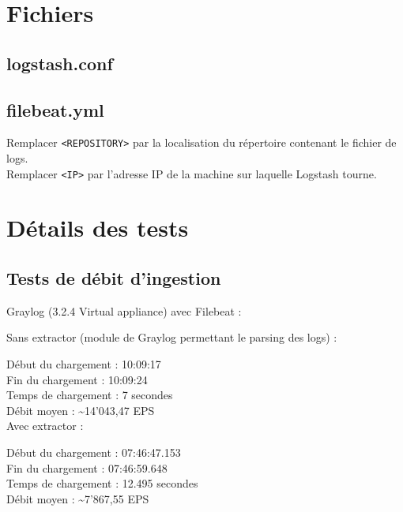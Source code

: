 \documentclass[paper=a4, fontsize=11pt]{scrartcl}
\begin{document}
\newpage

\appendix
\justify

\listoftables
\newpage

\listoffigures
\newpage

\printbibliography

\newpage

\section{Fichiers}

\subsection{logstash.conf}
\label{appendix:logstashConf}


\subsection{filebeat.yml}
\label{appendix:filebeatConf}

Remplacer \verb,<REPOSITORY>, par la localisation du répertoire contenant le fichier de logs.\\
Remplacer \verb,<IP>, par l'adresse IP de la machine sur laquelle Logstash tourne.


\newpage



\section{Détails des tests}

\subsection{Tests de débit d'ingestion}

Graylog (3.2.4 Virtual appliance) avec Filebeat :

Sans extractor (module de Graylog permettant le parsing des logs) :

Début du chargement : 10:09:17 \\
Fin du chargement : 10:09:24 \\
Temps de chargement : 7 secondes \\
Débit moyen : \textasciitilde 14'043,47 EPS \\

Avec extractor :

Début du chargement : 07:46:47.153 \\
Fin du chargement : 07:46:59.648 \\
Temps de chargement : 12.495 secondes \\
Débit moyen : \textasciitilde 7'867,55 EPS \\
\end{document}
